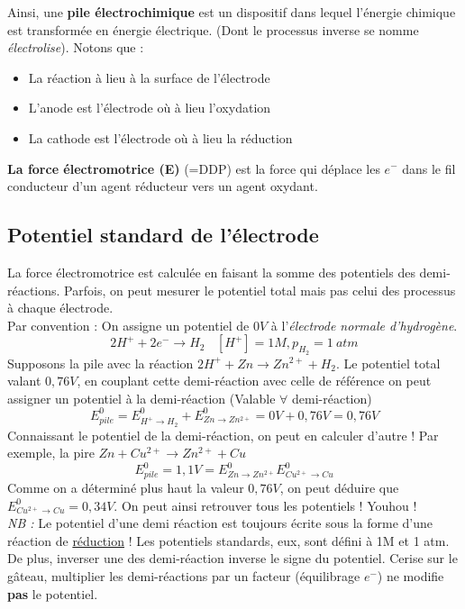 \documentclass[12pt, a4paper]{article}
\begin{document}
Ainsi, une \textbf{pile électrochimique} est un dispositif dans lequel l'énergie chimique est transformée en énergie électrique. (Dont le processus inverse se nomme \textit{électrolise}). Notons que :
\begin{itemize}
\item La réaction à lieu à la surface de l'électrode
\item L'anode est l'électrode où à lieu l'oxydation
\item La cathode est l'électrode où à lieu la réduction
\end{itemize}
\textbf{La force électromotrice (E)} (=DDP) est la force qui déplace les $e^-$ dans le fil conducteur d'un agent réducteur vers un agent oxydant. 

\subsection{Potentiel standard de l'électrode}
La force électromotrice est calculée en faisant la somme des potentiels des demi-réactions. Parfois, on peut mesurer le potentiel total mais pas celui des processus à chaque électrode.\\
Par convention  : On assigne un potentiel de $0 V$ à l'\textit{électrode normale d'hydrogène}.
$$2H^+ + 2e^- \rightarrow H_2\ \ \ \ [H^+] = 1M, p_{H_2} = 1\ atm$$
Supposons la pile avec la réaction $2H^+ + Zn \rightarrow Zn^{2+} + H_2$. Le potentiel total valant $0,76V$, en couplant cette demi-réaction avec celle de référence on peut assigner un potentiel à la demi-réaction (Valable $\forall$ demi-réaction)
$$E^0_{pile} = E^0_{H^+ \rightarrow H_2} + E^0_{Zn \rightarrow Zn^{2+}} = 0V + 0,76V = 0,76V$$
Connaissant le potentiel de la demi-réaction, on peut en calculer d'autre ! Par exemple, la pire $Zn + Cu^{2+} \rightarrow Zn^{2+} + Cu$
$$E^0_{pile} = 1,1V = E^0_{Zn \rightarrow Zn^{2+}}  E^0_{Cu^{2+} \rightarrow Cu}$$
Comme on a déterminé plus haut la valeur $0,76V$, on peut déduire que $E^0_{Cu^{2+} \rightarrow Cu} = 0,34V$. On peut ainsi retrouver tous les potentiels ! Youhou !\\

\textit{NB :} Le potentiel d'une demi réaction est toujours écrite sous la forme d'une réaction de \underline{réduction} ! Les potentiels standards, eux, sont défini à 1M et 1 atm. \\

De plus, inverser une des demi-réaction inverse le signe du potentiel. Cerise sur le gâteau, multiplier les demi-réactions par un facteur (équilibrage $e^-$) ne modifie \textbf{pas} le potentiel.
\end{document}
